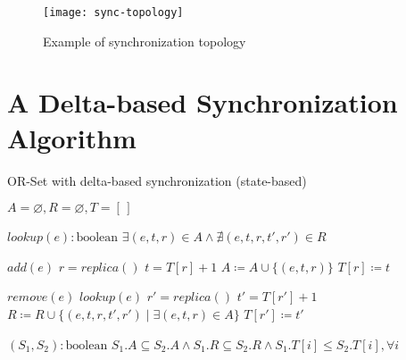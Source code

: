 \begin{figure}[t]
  \centering
  \begin{minipage}{\linewidth}
    \centering
    \texttt{[image: sync-topology]}
    \caption{Example of synchronization topology}
    \label{fig:sync_topology}
  \end{minipage}
\end{figure}


\section{A Delta-based Synchronization Algorithm}
\label{sec:delta-based_synchronization_algorithm}

\begin{algorithm}[t]
\small{
	\caption{OR-Set with delta-based synchronization (state-based)}
 	\label{alg:or_set_with_deltas}                       

 	\begin{algorithmic}[1]
 	  \State \Payload $A = \varnothing, R = \varnothing, T = [\,]$
 	  
 	  \State \Query $lookup(e) : \text{boolean}$
 	  \State \hspace{\algorithmicindent} \Return $\exists (e, t, r) \in A \land \nexists (e, t, r, t', r') \in R$
 	  
 	  \State \Update $add(e)$
 	  \State \hspace{\algorithmicindent} \Let $r = replica()$
 	  \State \hspace{\algorithmicindent} \Let $t = T[r] + 1$
 	  \State \hspace{\algorithmicindent} $A \coloneqq A \cup \{(e, t, r)\}$
 	  \State \hspace{\algorithmicindent} $T[r] \coloneqq  t$

 	  \State \Update $remove(e)$
 	  \State \hspace{\algorithmicindent} \Pre $lookup(e)$
 	  \State \hspace{\algorithmicindent} \Let $r' = replica()$
 	  \State \hspace{\algorithmicindent} \Let $t' = T[r'] + 1$
 	  \State \hspace{\algorithmicindent} $R \coloneqq R \cup \{(e, t, r, t', r') \mid \exists (e, t, r) \in A\}$
 	  \State \hspace{\algorithmicindent} $T[r'] \coloneqq  t'$

 	  \State \Compare $(S_{1}, S_{2}) : \text{boolean}$
 	  \State \hspace{\algorithmicindent} \Return $S_{1}.A \subseteq S_{2}.A \land S_{1}.R \subseteq S_{2}.R \land S_{1}.T[i] \leq S_{2}.T[i], \forall i$


\end{algorithmic}}
\end{algorithm}
